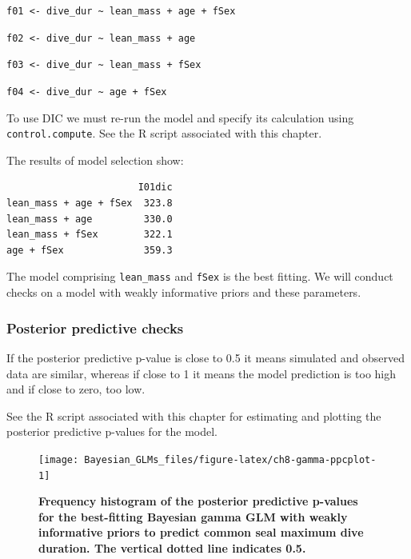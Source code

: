 \documentclass[
]{book}
\begin{document}
\texttt{f01\ \textless{}-\ dive\_dur\ \textasciitilde{}\ lean\_mass\ +\ age\ +\ fSex}

\texttt{f02\ \textless{}-\ dive\_dur\ \textasciitilde{}\ lean\_mass\ +\ age}

\texttt{f03\ \textless{}-\ dive\_dur\ \textasciitilde{}\ lean\_mass\ +\ fSex}

\texttt{f04\ \textless{}-\ dive\_dur\ \textasciitilde{}\ age\ +\ fSex}

To use DIC we must re-run the model and specify its calculation using \texttt{control.compute}. See the R script associated with this chapter.

The results of model selection show:

\begin{verbatim}
                       I01dic
lean_mass + age + fSex  323.8
lean_mass + age         330.0
lean_mass + fSex        322.1
age + fSex              359.3
\end{verbatim}

The model comprising \texttt{lean\_mass} and \texttt{fSex} is the best fitting. We will conduct checks on a model with weakly informative priors and these parameters.

\hypertarget{gamma-ppc}{%
\subsubsection{Posterior predictive checks}\label{gamma-ppc}}

If the posterior predictive p-value is close to 0.5 it means simulated and observed data are similar, whereas if close to 1 it means the model prediction is too high and if close to zero, too low.

See the R script associated with this chapter for estimating and plotting the posterior predictive p-values for the model.



\begin{figure}

{\centering \texttt{[image: Bayesian\_GLMs\_files/figure-latex/ch8-gamma-ppcplot-1]} 

}

\caption{\textbf{Frequency histogram of the posterior predictive p-values for the best-fitting Bayesian gamma GLM with weakly informative priors to predict common seal maximum dive duration. The vertical dotted line indicates 0.5.}}\label{fig:ch8-gamma-ppcplot}
\end{figure}
\end{document}
